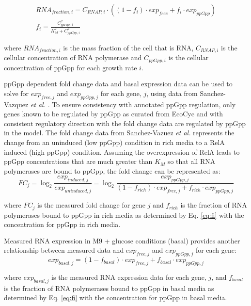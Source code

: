 \documentclass[12pt]{article}
\begin{document}
\begin{gather}
RNA_{fraction, i} = C_{RNAP, i}\cdot ((1-f_i)\cdot exp_{free} + f_i\cdot exp_{ppGpp})
\label{eq:RNA-fit} \\
f_i = \frac{C_{ppGpp, i}^2}{K_M^2 + C_{ppGpp, i}^2}
\label{eq:fi}
\end{gather}

\noindent where $RNA_{fraction, i}$ is the mass fraction of the cell that is RNA, $C_{RNAP, i}$ is the cellular concentration of RNA polymerase and $C_{ppGpp, i}$ is the cellular concentration of ppGpp for each growth rate $i$.

ppGpp dependent fold change data and basal expression data can be used to solve for $exp_{free, j}$ and $exp_{ppGpp, j}$ for each gene, $j$, using data from Sanchez-Vazquez \textit{et al.} \cite{sanchez2019genome}.  To ensure consistency with annotated ppGpp regulation, only genes known to be regulated by ppGpp as curated from EcoCyc \cite{karp2014ecocyc} and with consistent regulatory direction with the fold change data are regulated by ppGpp in the model.  The fold change data from Sanchez-Vazuez \textit{et al.} represents the change from an uninduced (low ppGpp) condition in rich media to a RelA induced (high ppGpp) condition.  Assuming the overexpression of RelA leads to ppGpp concentrations that are much greater than $K_M$ so that all RNA polymerases are bound to ppGpp, the fold change can be represented as:
\begin{equation}
FC_j = \log_2\frac{exp_{induced, j}}{exp_{uninduced, j}} = \log_2\frac{exp_{ppGpp, j}}{(1 - f_{rich})\cdot exp_{free, j} + f_{rich}\cdot exp_{ppGpp, j}}
\label{eq:fc-ppgpp}
\end{equation}

\noindent where $FC_j$ is the measured fold change for gene $j$ and $f_{rich}$ is the fraction of RNA polymerases bound to ppGpp in rich media as determined by Eq. \ref{eq:fi} with the concentration for ppGpp in rich media.

Measured RNA expression in M9 + glucose conditions (basal) provides another relationship between measured data and $exp_{free, j}$ and $exp_{ppGpp, j}$ for each gene:
\begin{equation}
exp_{basal, j} = (1 - f_{basal}) \cdot exp_{free, j} + f_{basal} \cdot exp_{ppGpp, j}
\label{eq:exp-basal}
\end{equation}

\noindent where $exp_{basal, j}$ is the measured RNA expression data for each gene, $j$, and $f_{basal}$ is the fraction of RNA polymerases bound to ppGpp in basal media as determined by Eq. \ref{eq:fi} with the concentration for ppGpp in basal media.
\end{document}
